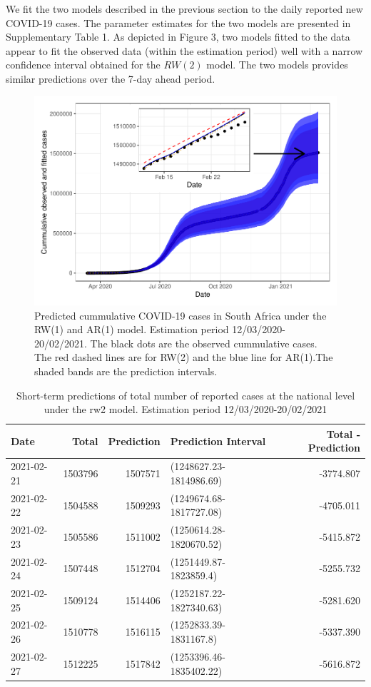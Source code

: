 \documentclass[10pt,letterpaper]{article}
\begin{document}
We fit the two models described in the previous section to the daily
reported new COVID-19 cases. The parameter estimates for the two models
are presented in Supplementary Table 1. As depicted in Figure 3, two
models fitted to the data appear to fit the observed data (within the
estimation period) well with a narrow confidence interval obtained for
the \(RW(2)\) model. The two models provides similar predictions over
the 7-day ahead period.

\begin{figure}[H]
\includegraphics[width=0.99\linewidth]{COVIDincidenceSA_files/figure-latex/predd-1} \caption{Predicted cummulative COVID-19 cases in South Africa under the RW(1) and AR(1) model. Estimation period 12/03/2020-20/02/2021. The black dots are the observed cummulative cases. The red dashed lines are for RW(2) and the blue line for AR(1).The shaded bands are the prediction intervals. }\label{fig:predd}
\end{figure}

\begin{table}[!h]

\caption{\label{tab:unnamed-chunk-10}Short-term predictions of total number of reported cases at the national level under the rw2 model. Estimation period 12/03/2020-20/02/2021}
\centering
\begin{tabular}[t]{l|r|r|l|r}
\hline
Date & Total & Prediction & Prediction Interval & Total - Prediction\\
\hline
2021-02-21 & 1503796 & 1507571 & (1248627.23-1814986.69) & -3774.807\\
\hline
2021-02-22 & 1504588 & 1509293 & (1249674.68-1817727.08) & -4705.011\\
\hline
2021-02-23 & 1505586 & 1511002 & (1250614.28-1820670.52) & -5415.872\\
\hline
2021-02-24 & 1507448 & 1512704 & (1251449.87-1823859.4) & -5255.732\\
\hline
2021-02-25 & 1509124 & 1514406 & (1252187.22-1827340.63) & -5281.620\\
\hline
2021-02-26 & 1510778 & 1516115 & (1252833.39-1831167.8) & -5337.390\\
\hline
2021-02-27 & 1512225 & 1517842 & (1253396.46-1835402.22) & -5616.872\\
\hline
\end{tabular}
\end{table}
\end{document}
